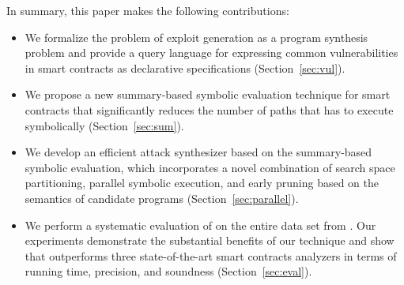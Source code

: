 In summary, this paper makes the following contributions:
\begin{itemize}
\item We formalize the problem of exploit generation as a program synthesis problem 
and provide a query language for expressing common vulnerabilities in smart contracts as declarative
specifications (Section~\ref{sec:vul}).
\item We propose a new summary-based symbolic evaluation technique for smart contracts that significantly reduces the number of paths that \toolname has to execute symbolically (Section~\ref{sec:sum}).
\item We develop an efficient attack synthesizer based on the summary-based symbolic 
evaluation, which incorporates a novel combination of search space partitioning, parallel
symbolic execution, and early pruning based on the semantics of
candidate programs (Section~\ref{sec:parallel}).
\item We perform a systematic evaluation of \toolname on the entire data set
from \etherscan. Our experiments demonstrate the substantial benefits of our
technique and show that \toolname outperforms three state-of-the-art smart
contracts analyzers in terms of running time, precision, and soundness
(Section~\ref{sec:eval}).
\end{itemize}
